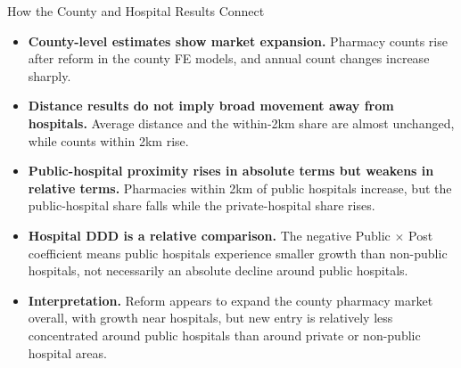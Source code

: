 \documentclass{beamer}
\begin{document}
\begin{frame}{How the County and Hospital Results Connect}

\scriptsize
\begin{itemize}\setlength\itemsep{0.7em}
    \item \textbf{County-level estimates show market expansion.}
    Pharmacy counts rise after reform in the county FE models, and annual count changes increase sharply.
    \item \textbf{Distance results do not imply broad movement away from hospitals.}
    Average distance and the within-2km share are almost unchanged, while counts within 2km rise.
    \item \textbf{Public-hospital proximity rises in absolute terms but weakens in relative terms.}
    Pharmacies within 2km of public hospitals increase, but the public-hospital share falls while the private-hospital share rises.
    \item \textbf{Hospital DDD is a relative comparison.}
    The negative Public $\times$ Post coefficient means public hospitals experience smaller growth than non-public hospitals, not necessarily an absolute decline around public hospitals.
    \item \textbf{Interpretation.}
    Reform appears to expand the county pharmacy market overall, with growth near hospitals, but new entry is relatively less concentrated around public hospitals than around private or non-public hospital areas.
\end{itemize}

\end{frame}
\end{document}
